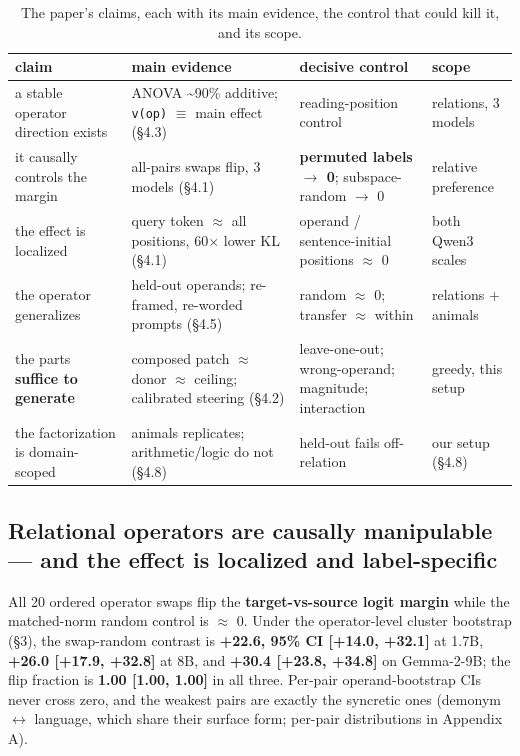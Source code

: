{
\begin{table}[t]
\centering\footnotesize
\setlength{\tabcolsep}{4pt}
\begin{tabular}{@{}>{\raggedright\arraybackslash}p{}>{\raggedright\arraybackslash}p{}>{\raggedright\arraybackslash}p{}>{\raggedright\arraybackslash}p{}@{}}
\toprule
claim & main evidence & decisive control & scope \\
\midrule
a stable operator direction exists & ANOVA \textasciitilde90\% additive;
\texttt{v(op)} \ensuremath{\equiv} main effect (\S{}4.3) & reading-position control & 9
relations, 3 models \\
it causally controls the margin & all-pairs swaps flip, 3 models (\S{}4.1)
& \textbf{permuted labels \ensuremath{\to} 0}; subspace-random \ensuremath{\to} 0 & relative
preference \\
the effect is localized & query token \ensuremath{\approx} all positions, 60\ensuremath{\times} lower KL
(\S{}4.1) & operand / sentence-initial positions \ensuremath{\approx} 0 & both Qwen3 scales \\
the operator generalizes & held-out operands; re-framed, re-worded
prompts (\S{}4.5) & random \ensuremath{\approx} 0; transfer \ensuremath{\approx} within & relations + animals \\
the parts \textbf{suffice to generate} & composed patch \ensuremath{\approx} donor \ensuremath{\approx}
ceiling; calibrated steering (\S{}4.2) & leave-one-out; wrong-operand;
magnitude; interaction & greedy, this setup \\
the factorization is domain-scoped & animals replicates;
arithmetic/logic do not (\S{}4.8) & held-out fails off-relation & our setup
(\S{}4.8) \\
\bottomrule
\end{tabular}
\caption{The paper's claims, each with its main evidence, the control that could kill it, and its scope.}
\end{table}
}

\subsection{Relational operators are causally manipulable --- and
the effect is localized and
label-specific}

All 20 ordered operator swaps flip the \textbf{target-vs-source logit
margin} while the matched-norm random control is \ensuremath{\approx} 0. Under the
operator-level cluster bootstrap (\S{}3), the swap-random contrast is
\textbf{+22.6, 95\% CI {[}+14.0, +32.1{]}} at 1.7B, \textbf{+26.0
{[}+17.9, +32.8{]}} at 8B, and \textbf{+30.4 {[}+23.8, +34.8{]}} on
Gemma-2-9B; the flip fraction is \textbf{1.00 {[}1.00, 1.00{]}} in all
three. Per-pair operand-bootstrap CIs never cross zero, and the weakest
pairs are exactly the syncretic ones (demonym \ensuremath{\leftrightarrow} language, which share
their surface form; per-pair distributions in Appendix A).

